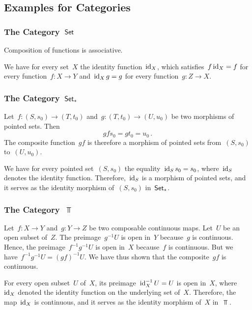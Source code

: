 \subsection{Examples for Categories}



\subsubsection{The Category~$\mathsf{Set}$}

Composition of functions is associative.

We have for every set~$X$ the identity function~$\operatorname{id}_X$, which satisfies~$f \operatorname{id}_X = f$ for every function~$f \colon X \to Y$ and~$\operatorname{id}_X g = g$ for every function~$g \colon Z \to X$.



\subsubsection{The Category~$\mathsf{Set}_*$}

Let~$f \colon (S, s_0) \to (T, t_0)$ and~$g \colon (T, t_0) \to (U, u_0)$ be two morphisms of pointed sets.
Then
\[
	g f s_0 = g t_0 = u_0 \,.
\]
The composite function~$g f$ is therefore a morphism of pointed sets from~$(S, s_0)$ to~$(U, u_0)$.

We have for every pointed set~$(S, s_0)$ the equality~$\operatorname{id}_S s_0 = s_0$, where~$\operatorname{id}_S$ denotes the identity function.
Therefore,~$\operatorname{id}_S$ is a morphism of pointed sets, and it serves as the identity morphism of~$(S, s_0)$ in~$\mathsf{Set}_*$.



\subsubsection{The Category~$\Top$}

Let~$f \colon X \to Y$ and~$g \colon Y \to Z$ be two composable continuous maps.
Let~$U$ be an open subset of~$Z$.
The preimage~$g^{-1} U$ is open in~$Y$ because~$g$ is continuous.
Hence, the preimage~$f^{-1} g^{-1} U$ is open in~$X$ because~$f$ is continuous.
But we have~$f^{-1} g^{-1} U = (g f)^{-1} U$.
We have thus shown that the composite~$g f$ is continuous.

For every open subset~$U$ of~$X$, its preimage~$\operatorname{id}_X^{-1} U = U$ is open in~$X$, where~$\operatorname{id}_X$ denoted the identity function on the underlying set of~$X$.
Therefore, the map~$\operatorname{id}_X$ is continuous, and it serves as the identity morphism of~$X$ in~$\Top$.



